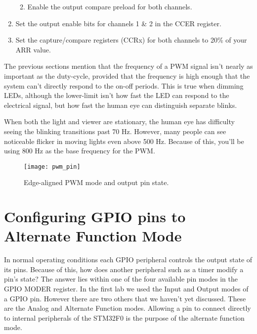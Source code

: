 \documentclass[openany,11pt,fleqn]{book} %
\begin{document}
\begin{exercise}
\begin{enumerate}
\begin{enumerate}
\begin{itemize}
            \end{itemize}
            \item Enable the output compare preload for both channels.
        \end{enumerate}
        \item Set the output enable bits for channels 1 \& 2 in the CCER register.
        \item Set the capture/compare registers (CCRx) for both channels to 20\% of your ARR value.
    \end{enumerate}
\noindent The previous sections mention that the frequency of a PWM signal isn't nearly as important as the duty-cycle, provided that the frequency is high enough that the system can't directly respond to the on-off periods. This is true when dimming LEDs, although the lower-limit isn't how fast the LED can respond to the electrical signal, but how fast the human eye can distinguish separate blinks.

When both the light and viewer are stationary, the human eye has difficulty seeing the blinking transitions past 70 Hz. However, many people can see noticeable flicker in moving lights even above 500 Hz. Because of this, you'll be using 800 Hz as the base frequency for the PWM. 

\end{exercise}

     \begin{figure}[!b]
    \centering\texttt{[image: pwm\_pin]}
    \caption{Edge-aligned PWM mode and output pin state.}
    \label{pwm_pin}
\end{figure}

\section{Configuring GPIO pins to Alternate Function Mode} \label{alternate_mode}

In normal operating conditions each GPIO peripheral controls the output state of its pins. Because of this, how does another peripheral such as a timer modify a pin's state? The answer lies within one of the four available pin modes in the GPIO MODER register. In the first lab we used the Input and Output modes of a GPIO pin. However there are two others that we haven't yet discussed. These are the Analog and Alternate Function modes. Allowing a pin to connect directly to internal peripherals of the STM32F0 is the purpose of the alternate function mode. 
\end{document}
